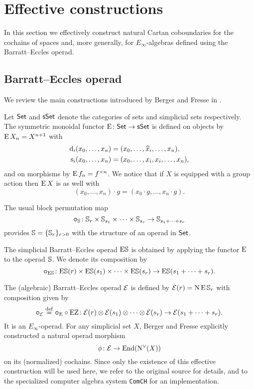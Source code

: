 
\section{Effective constructions}

In this section we effectively construct natural Cartan coboundaries for the cochains of spaces and, more generally, for $E_\infty$-algebras defined using the Barratt--Eccles operad.

\subsection{Barratt--Eccles operad}

We review the main constructions introduced by Berger and Fresse in \cite{berger2004combinatorial}.

Let $\mathsf{Set}$ and $\mathsf{sSet}$ denote the categories of sets and simplicial sets respectively.
The symmetric monoidal functor $\operatorname{E} \colon \mathsf{Set} \to \mathsf{sSet}$ is defined on objects by $\operatorname{E} X_n = X^{n+1}$ with
\[
\begin{split}
	\operatorname{d}_i(x_0,\dots,x_n) &= (x_0,\dots,\widehat{x}_i,\dots,x_n), \\
	\operatorname{s}_i(x_0,\dots,x_n) &= (x_0, \dots, x_i, x_i, \dots, x_n),
\end{split}
\]
and on morphisms by $\operatorname{E} f_n = f^{\times n}$.
We notice that if $X$ is equipped with a group action then $\operatorname{E} X$ is as well with
\[
(x_0,\dots,x_n) \cdot g = (x_0 \cdot g, \dots, x_n \cdot g).
\]

The usual block permutation map
\[
\bm{\circ}_{\mathbb{S}} \colon \mathbb{S}_r \times \mathbb{S}_{s_1} \times \cdots \times \mathbb{S}_{s_r} \to \mathbb{S}_{s_1+\dots+s_r}
\]
provides $\mathbb{S} = \{\mathbb{S}_r\}_{r>0}$ with the structure of an operad in $\mathsf{Set}$.

The simplicial Barratt--Eccles operad $\mathrm{E}\mathbb{S}$ is obtained by applying the functor $\operatorname{E}$ to the operad $\mathbb{S}$.
We denote its composition by
\[
\bm{\circ}_{\mathrm{E}\mathbb{S}} \colon
\mathrm{E}\mathbb{S}(r) \times \mathrm{E}\mathbb{S}(s_1) \times\dots\times \mathrm{E}\mathbb{S}(s_r) \to
\mathrm{E}\mathbb{S}(s_1+\dots+s_r).
\]

The (algebraic) Barratt--Eccles operad $\mathcal{E}$ is defined by $\mathcal{E}(r) = \operatorname{N}\operatorname{E}\mathbb{S}_r$ with composition given by
\[
\bm{\circ}_{\mathcal{E}} \stackrel{\mathrm{def}}{=} \bm{\circ}_{\operatorname{E}} \circ \operatorname{EZ} \colon \mathcal{E}(r) \otimes \mathcal{E}(s_1) \otimes\dotsb\otimes \mathcal{E}(s_r) \to \mathcal{E}(s_1+\dots+s_r).
\]
It is an $E_\infty$-operad.
For any simplicial set $X$, Berger and Fresse explicitly constructed a natural operad morphism
\[
\phi \colon \mathcal{E} \to \mathrm{End}(\operatorname{N^{\vee}}(X))
\]
on its (normalized) cochains.
Since only the existence of this effective construction will be used here, we refer to the original source for details, and to the specialized computer algebra system \texttt{ComCH} for an implementation.

